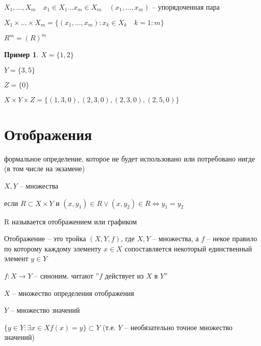 \documentclass{book}
\theoremstyle{definition}
\newtheorem*{example}{Пример}
\begin{document}
        $X_1, \ldots, X_m\quad x_1\in X_1 \ldots x_m\in X_m\quad (x_{1}, \ldots, x_{m} )$ -- упорядоченная пара

        \begin{definition}

            $X_1\times \ldots\times X_m = \{(x_1, \ldots, x_{m} ):x_k\in X_k\quad k = 1:m\}$

            $R^m = (R)^m$
        \end{definition}

        \begin{example}
            $X = \{1,2\}$

            $Y = \{3,5\}$

            $Z = \{0\}$

            $X\times Y\times Z = \{(1,3,0),(2,3,0),(2,3,0),(2,5,0)\}$
        \end{example}

        \section{Отображения}
        формальное определение, которое не будет использовано или потребовано нигде (в том числе на экзамене)
        \begin{definition}
           $X,Y$ -- множества

           если $R\subset X\times Y$ и $(x,y_1)\in R \vee (x,y_2)\in R \iff y_1=y_2$



    R называется отображением или графиком
    \end{definition}
    
        

    \begin{definition}
            Отображение -- это тройка $(X,Y,f)$, где $X,Y$ -- множества, а $f$ -- некое правило по которому каждому элементу $x\in X$ сопоставляется некоторый единственный элемент $y\in Y$
            
            $f:X\to Y$ -- синоним. читают ''$f$ действует из $X$ в $Y$''

            $X$ -- множество определения отображения

            $Y$ -- множество значений

            $\{y\in Y: \exists x\in X f(x) = y\}\subset Y$ (т.е. $Y$ -- необязательно точное множество значений)
    \end{definition}
    
\end{document}
